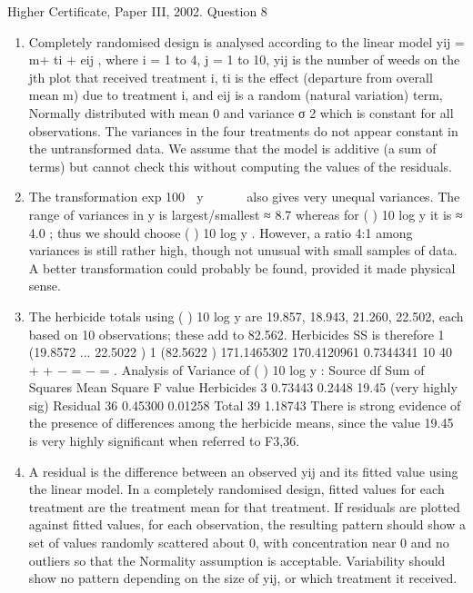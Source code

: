 \documentclass[a4paper,12pt]{article}
\begin{document}
Higher Certificate, Paper III, 2002. Question 8
\begin{enumerate}

\item  Completely randomised design is analysed according to the linear model
yij = m+ ti + eij , where i = 1 to 4, j = 1 to 10,
yij is the number of weeds on the jth plot that received treatment i, ti is the effect
(departure from overall mean m) due to treatment i, and eij is a random (natural
variation) term, Normally distributed with mean 0 and variance σ
2 which is constant
for all observations.
The variances in the four treatments do not appear constant in the untransformed data.
We assume that the model is additive (a sum of terms) but cannot check this without
computing the values of the residuals.
\item  The transformation exp
100
 y 
 
 
also gives very unequal variances. The range
of variances in y is largest/smallest ≈ 8.7 whereas for ( ) 10 log y it is ≈ 4.0 ; thus
we should choose ( ) 10 log y . However, a ratio 4:1 among variances is still rather
high, though not unusual with small samples of data. A better transformation could
probably be found, provided it made physical sense.
\item  The herbicide totals using ( ) 10 log y are 19.857, 18.943, 21.260, 22.502, each
based on 10 observations; these add to 82.562. Herbicides SS is therefore
1 (19.8572 ... 22.5022 ) 1 (82.5622 ) 171.1465302 170.4120961 0.7344341
10 40
+ + − = − = .
Analysis of Variance of ( ) 10 log y :
Source df Sum of Squares Mean Square F value
Herbicides 3 0.73443 0.2448 19.45 (very highly sig)
Residual 36 0.45300 0.01258
Total 39 1.18743
There is strong evidence of the presence of differences among the herbicide means,
since the value 19.45 is very highly significant when referred to F3,36.
\item  A residual is the difference between an observed yij and its fitted value using
the linear model. In a completely randomised design, fitted values for each treatment
are the treatment mean for that treatment. If residuals are plotted against fitted values,
for each observation, the resulting pattern should show a set of values randomly
scattered about 0, with concentration near 0 and no outliers so that the Normality
assumption is acceptable. Variability should show no pattern depending on the size of
yij, or which treatment it received.
\end{enumerate}
\end{document}
